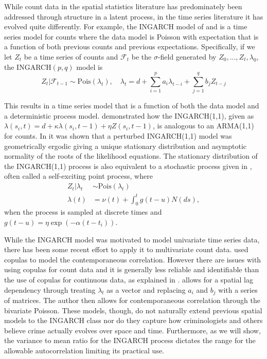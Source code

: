 \documentclass[11pt]{isuthesis}
\begin{document}
While count data in the spatial statistics literature has predominately been addressed through structure in a latent process, in the time series literature it has evolved quite differently.  For example, the INGARCH model of \cite{ferland2006integer} and \cite{heinen2003modelling} is a time series model for counts where the data model is Poisson with expectation that is a function of both previous counts and previous expectations.  Specifically, if we let ${Z_t}$ be a time series of counts and $\mathcal{F}_t$ be the $\sigma$-field generated by ${Z_0,...,Z_t,\lambda_0}$, the INGARCH$(p,q)$ model is
\begin{equation}
	Z_t|\mathcal{F}_{t-1}\sim \mbox{Pois}(\lambda_t),\quad \lambda_t=d + \sum_{i=1}^p a_i \lambda_{t-i}+\sum_{j=1}^q b_j Z_{t-j}\label{eq:INGARCH}
\end{equation}

This results in a time series model that is a function of both the data model and a deterministic process model.  \cite{ferland2006integer} demonstrated how the INGARCH(1,1), given as $\lambda(s_i,t)=d+\kappa \lambda(s_i,t-1)+\eta Z(s_i,t-1)$, is analogous to an ARMA(1,1) for counts.  In \cite{fokianos2009poisson} it was shown that a perturbed INGARCH(1,1) model was geometrically ergodic giving a unique stationary distribution and asymptotic normality of the roots of the likelihood equations.  The stationary distribution of the INGARCH(1,1) process is also equivalent to a stochastic process given in \cite{hawkes1971spectra}, often called a self-exciting point process, where 
\begin{align}
Z_t|\lambda_t& \sim \mbox{Pois}(\lambda_t)\\
 \lambda(t) & = \nu(t) + \int_{0}^{t} g (t-u) N(ds)\nonumber,
\end{align}
when the process is sampled at discrete times and $g(t-u)=\eta \exp(-\alpha (t-t_i))$.

While the INGARCH model was motivated to model univariate time series data, there has been some recent effort to apply it to multivariate count data.  \cite{heinen2007multivariate} used copulas to model the contemporaneous correlation.  However there are issues with using copulas for count data and it is generally less reliable and identifiable than the use of copulas for continuous data, as explained in \cite{genest2007primer}.  \cite{liu2012some} allows for a spatial lag dependency through treating $\lambda_t$ as a vector and replacing $a_i$ and $b_j$ with a series of matrices.  The author then allows for contemporaneous correlation through the bivariate Poisson.  These models, though, do not naturally extend previous spatial models to the INGARCH class nor do they capture how criminologists and others believe crime actually evolves over space and time.  Furthermore, as we will show, the variance to mean ratio for the INGARCH process dictates the range for the allowable autocorrelation limiting its practical use.
\end{document}
